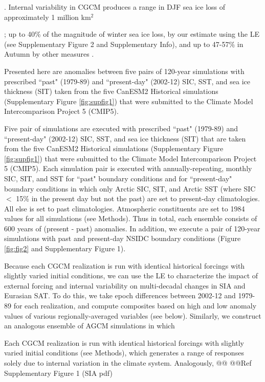 \documentclass{nature}
\begin{document}
. Internal variability in CGCM produces a range in DJF sea ice loss of approximately 1 million km$^2$ 

; up to 40\% of the magnitude of winter sea ice loss, by our estimate using the LE (see Supplementary Figure 2 and Supplementary Info), and up to 47-57\% in Autumn by other measures \cite{stroeve07,kay11}. 


 Presented here are anomalies between five pairs of 120-year simulations with prescribed ``past" (1979-89) and ``present-day" (2002-12) SIC, SST, and sea ice thickness (SIT) taken from the five CanESM2 Historical simulations (Supplementary Figure \ref{fig:supfig1}) that were submitted to the Climate Model Intercomparison Project 5 (CMIP5).

 Five pair of simulations are executed with prescribed ``past" (1979-89) and ``present-day" (2002-12) SIC, SST, and sea ice thickness (SIT) that are taken from the five CanESM2 Historical simulations (Supplementary Figure \ref{fig:supfig1}) that were submitted to the Climate Model Intercomparison Project 5 (CMIP5). Each simulation pair is executed with annually-repeating, monthly SIC, SIT, and SST for ``past" boundary conditions and for ``present-day" boundary conditions in which only Arctic SIC, SIT, and Arctic SST (where SIC $<$ 15\% in the present day but not the past) are set to present-day climatologies. All else is set to past climatologies. Atmospheric constituents are set to 1984 values for all simulations (see Methods). Thus in total, each ensemble consists of 600 years of (present - past) anomalies. In addition, we execute a pair of 120-year simulations with past and present-day NSIDC boundary conditions (Figure \ref{fig:fig2} and Supplementary Figure 1).



Because each CGCM realization is run with identical historical forcings with slightly varied initial conditions, we can use the LE to characterize the impact of external forcing and internal variability on multi-decadal changes in SIA and Eurasian SAT. To do this, we take epoch differences between 2002-12 and 1979-89 for each realization, and compute composites based on high and low anomaly values of various regionally-averaged variables (see below). Similarly, we construct an analogous ensemble of AGCM simulations in which  

Each CGCM realization is run with identical historical forcings with slightly varied initial conditions (see Methods), which generates a range of responses solely due to internal variation in the climate system. Analogously, @@
@@Ref Supplementary Figure 1 (SIA pdf)
\end{document}
